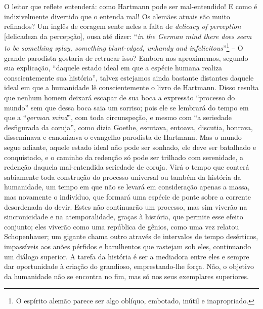     O leitor que reflete entenderá: como Hartmann pode ser
    mal-entendido! E como é indizivelmente divertido que o entenda mal!
    Os alemães atuais são muito refinados? Um inglês de coragem sente
    neles a falta de \emph{delicacy of perception} {[}delicadeza da
    percepção{]}, ousa até dizer: ``\emph{in the German mind there
    does seem to be something splay, something blunt-edged, unhandy and
    infelicitous}''\footnote{O espírito alemão parece ser algo oblíquo,
      embotado, inútil e inapropriado.} -- O grande parodista gostaria
    de retrucar isso? Embora nos aproximemos, segundo sua explicação,
    ``daquele estado ideal em que a espécie humana realiza
    conscientemente sua história'', talvez estejamos ainda bastante
    distantes daquele ideal em que a humanidade lê conscientemente o
    livro de Hartmann. Disso resulta que nenhum homem deixará escapar de
    sua boca a expressão ``processo do mundo'' sem que dessa boca saia
    um sorriso; pois ele se lembrará do tempo em que a ``\emph{german
    mind}'', com toda circunspeção, e mesmo com ``a seriedade
    desfigurada da coruja'', como dizia Goethe, escutava, entoava,
    discutia, honrava, disseminava e canonizava o evangelho parodista de
    Hartmann. Mas o mundo segue adiante, aquele estado ideal não pode
    ser sonhado, ele deve ser batalhado e conquistado, e o caminho da
    redenção só pode ser trilhado com serenidade, a redenção daquela
    mal-entendida seriedade de coruja. Virá o tempo que conterá
    sabiamente toda construção do processo universal ou também da
    história da humanidade, um tempo em que não se levará em
    consideração apenas a massa, mas novamente o indivíduo, que formará
    uma espécie de ponte sobre a corrente desordenada do devir. Estes
    não continuarão um processo, mas sim viverão na sincronicidade e na
    atemporalidade, graças à história, que permite esse efeito conjunto;
    eles viverão como uma república de gênios, como uma vez relatou
    Schopenhauer; um gigante chama outro através de intervalos de
    tempo desérticos, impassíveis aos anões pérfidos e barulhentos que
    rastejam sob eles, continuando um diálogo superior. A tarefa da
    história é ser a mediadora entre eles e sempre dar oportunidade à
    criação do grandioso, emprestando-lhe força. Não, o objetivo da
    humanidade não se encontra no fim, mas só nos seus exemplares
    superiores.

